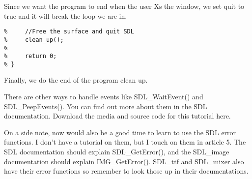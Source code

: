 Since we want the program to end when the user Xs the window, we set quit to
true and it will break the loop we are in.

\begin{verbatim}
%     //Free the surface and quit SDL
%     clean_up();
%         
%     return 0;    
% }
\end{verbatim}

Finally, we do the end of the program clean up.

There are other ways to handle events like SDL\_WaitEvent() and
SDL\_PeepEvents(). You can find out more about them in the SDL documentation.
Download the media and source code for this tutorial here.

On a side note, now would also be a good time to learn to use the SDL error
functions. I don't have a tutorial on them, but I touch on them in article 5.
The SDL documentation should explain SDL\_GetError(), and the SDL\_image
documentation should explain IMG\_GetError(). SDL\_ttf and SDL\_mixer also have
their error functions so remember to look those up in their documentations.
